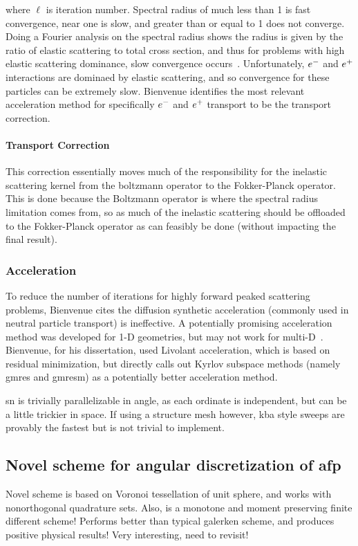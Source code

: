 where $\ell$ is iteration number. Spectral radius of much less than 1 is fast convergence, near one is slow, and greater than or equal to 1 does not converge. Doing a Fourier analysis on the spectral radius shows the radius is given by the ratio of elastic scattering to total cross section, and thus for problems with high elastic scattering dominance, slow convergence occurs~\cite{larsen_advances_2010}. Unfortunately, $e^{-}$ and $e^{+}$ interactions are dominaed by elastic scattering, and so convergence for these particles can be extremely slow. Bienvenue identifies the most relevant acceleration method for specifically $e^{-}$ and $e^{+}$ transport to be the transport correction. 

\paragraph{Transport Correction}
This correction essentially moves much of the responsibility for the inelastic scattering kernel from the boltzmann operator to the Fokker-Planck operator. This is done because the Boltzmann operator is where the spectral radius limitation comes from, so as much of the inelastic scattering should be offloaded to the Fokker-Planck operator as can feasibly be done (without impacting the final result).

\subsubsection{Acceleration}
To reduce the number of iterations for highly forward peaked scattering problems, Bienvenue cites the diffusion synthetic acceleration (commonly used in neutral particle transport) is ineffective. A potentially promising acceleration method was developed for 1-D geometries, but may not work for multi-D~\cite{morel_angular_1991}. Bienvenue, for his dissertation, used Livolant acceleration, which is based on residual minimization, but directly calls out Kyrlov subspace methods (namely \gls{gmres} and \gls{gmresm}) as a potentially better acceleration method. 

\gls{sn} is trivially parallelizable in angle, as each ordinate is independent, but can be a little trickier in space. If using a structure mesh however, \gls{kba} style sweeps are provably the fastest but is not trivial to implement.

\subsection{Novel scheme for angular discretization of \gls{afp}}
Novel scheme is based on Voronoi tessellation of unit sphere, and works with nonorthogonal quadrature sets. Also, is a monotone and moment preserving finite different scheme! Performs better than typical galerken scheme, and produces positive physical results! Very interesting, need to revisit!

